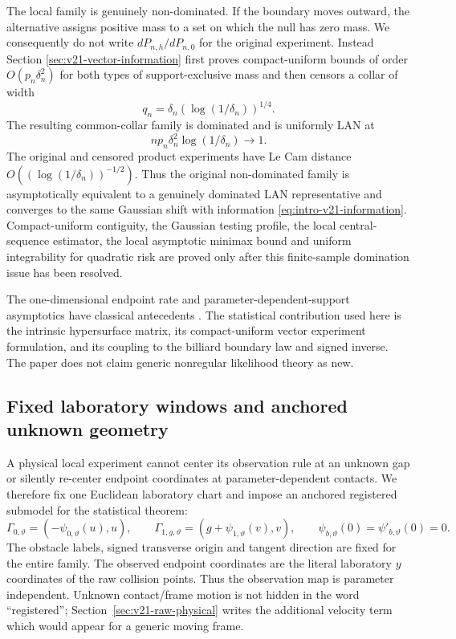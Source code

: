 The local family is genuinely non-dominated.  If the boundary moves outward,
the alternative assigns positive mass to a set on which the null has zero
mass.  We consequently do not write
$dP_{n,h}/dP_{n,0}$ for the original experiment.  Instead Section
\ref{sec:v21-vector-information} first proves compact-uniform bounds of order
$O(p_n\delta_n^2)$ for both types of support-exclusive mass and then censors
a collar of width
\[
 q_n=\delta_n(\log(1/\delta_n))^{1/4}.
\]
The resulting common-collar family is dominated and is uniformly LAN at
\begin{equation}\label{eq:intro-v21-critical}
 np_n\delta_n^2\log(1/\delta_n)\longrightarrow1.
\end{equation}
The original and censored product experiments have Le Cam distance
$O((\log(1/\delta_n))^{-1/2})$.  Thus the original non-dominated family is
asymptotically equivalent to a genuinely dominated LAN representative and
converges to the same Gaussian shift with information
\eqref{eq:intro-v21-information}.  Compact-uniform contiguity, the Gaussian
testing profile, the local central-sequence estimator, the local asymptotic
minimax bound and uniform integrability for quadratic risk are proved only
after this finite-sample domination issue has been resolved.

The one-dimensional endpoint rate and parameter-dependent-support asymptotics
have classical antecedents
\cite{Akahira1975a,Akahira1975b,Smith1985,IbragimovHasminskii,HiranoPorter}.
The statistical contribution used here is the intrinsic hypersurface matrix,
its compact-uniform vector experiment formulation, and its coupling to the
billiard boundary law and signed inverse.  The paper does not claim generic
nonregular likelihood theory as new.

\subsection{Fixed laboratory windows and anchored unknown geometry}

A physical local experiment cannot center its observation rule at an unknown
gap or silently re-center endpoint coordinates at parameter-dependent
contacts.  We therefore fix one Euclidean laboratory chart and impose an
anchored registered submodel for the statistical theorem:
\begin{equation}\label{eq:intro-v21-anchored}
 \Gamma_{0,\vartheta}=(-\psi_{0,\vartheta}(u),u),
 \qquad
 \Gamma_{1,g,\vartheta}=(g+\psi_{1,\vartheta}(v),v),
 \qquad
 \psi_{b,\vartheta}(0)=\psi'_{b,\vartheta}(0)=0.
\end{equation}
The obstacle labels, signed transverse origin and tangent direction are fixed
for the entire family.  The observed endpoint coordinates are the literal
laboratory $y$ coordinates of the raw collision points.  Thus the observation
map is parameter independent.  Unknown contact/frame motion is not hidden in
the word ``registered''; Section~\ref{sec:v21-raw-physical} writes the
additional velocity term which would appear for a generic moving frame.


